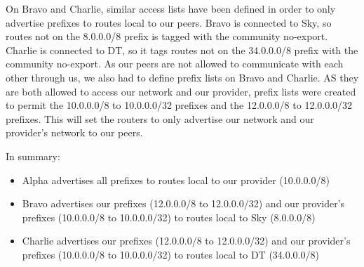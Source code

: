 On Bravo and Charlie, similar access lists have been defined in order to only
advertise prefixes to routes local to our peers. Bravo is connected to Sky, so
routes not on the 8.0.0.0/8 prefix is tagged with the community no-export.
Charlie is connected to DT, so it tags routes not on the 34.0.0.0/8 prefix with
the community no-export. As our peers are not allowed to communicate with each
other through us, we also had to define prefix lists on Bravo and Charlie. AS
they are both allowed to access our network and our provider, prefix lists were
created to permit the 10.0.0.0/8 to 10.0.0.0/32 prefixes and the 12.0.0.0/8 to
12.0.0.0/32 prefixes. This will set the routers to only advertise our network
and our provider's network to our peers.

In summary:

\begin{itemize}
  \item Alpha advertises all prefixes to routes local to our provider
  (10.0.0.0/8)
  \item Bravo advertises our prefixes (12.0.0.0/8 to 12.0.0.0/32) and our
  provider's prefixes (10.0.0.0/8 to 10.0.0.0/32) to routes local to Sky
  (8.0.0.0/8)
  \item Charlie advertises our prefixes (12.0.0.0/8 to 12.0.0.0/32) and our
  provider's prefixes (10.0.0.0/8 to 10.0.0.0/32) to routes local to DT
  (34.0.0.0/8)
\end{itemize}